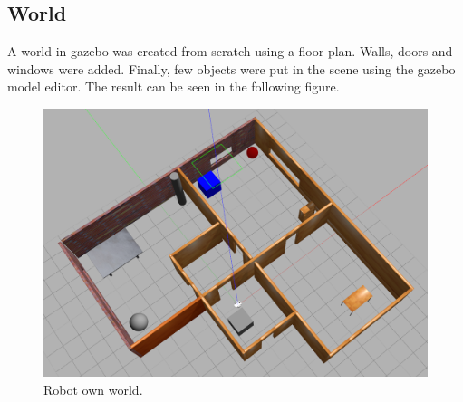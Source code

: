 \documentclass[10pt,journal,compsoc]{IEEEtran}
\begin{document}
\subsection{World}
A world in gazebo was created from scratch using a floor plan. Walls, doors and windows were added. Finally, few objects were put in the scene using the gazebo model editor. The result can be seen in the following figure.
\begin{figure}[h]
\centering
\includegraphics[scale=0.20]{robot-own-world}
\caption{Robot own world.}
\label{fig:world}
\end{figure}
\end{document}
